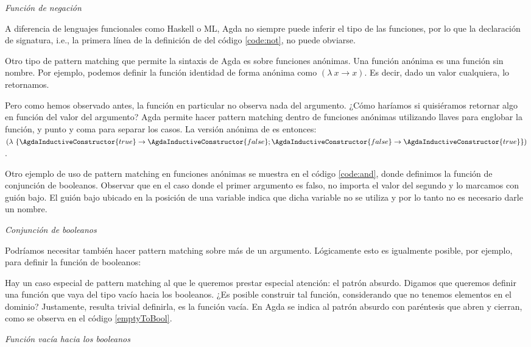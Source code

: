 \begin{agdacode}{\it Función de negación}\label{code:not}
  
\end{agdacode}

A diferencia de lenguajes funcionales como Haskell o ML, Agda no siempre puede inferir el tipo de las funciones, por lo que la declaración de signatura, i.e., la primera línea de la definición de  del código \ref{code:not}, no puede obviarse. 

Otro tipo de pattern matching que permite la sintaxis de Agda es sobre funciones anónimas. Una función anónima es una función sin nombre. Por ejemplo, podemos definir la función identidad de forma anónima como $(\lambda\ x \to x)$. Es decir, dado un valor cualquiera, lo retornamos.

Pero como hemos observado antes, la función  en particular no observa nada del argumento. ¿Cómo haríamos si quisiéramos retornar algo en función del valor del argumento? Agda permite hacer pattern matching dentro de funciones anónimas utilizando llaves para englobar la función, y punto y coma para separar los casos. La versión anónima de  es entonces: $(\lambda\ \{ \AgdaInductiveConstructor{true} \to \AgdaInductiveConstructor{false} ; \AgdaInductiveConstructor{false} \to \AgdaInductiveConstructor{true} \})$.

Otro ejemplo de uso de pattern matching en funciones anónimas se muestra en el código \ref{code:and}, donde definimos la función  de conjunción de booleanos. Observar que en el caso donde el primer argumento es falso, no importa el valor del segundo y lo marcamos con guión bajo. El guión bajo ubicado en la posición de una variable indica que dicha variable no se utiliza y por lo tanto no es necesario darle un nombre.  

\begin{agdacode}{\it Conjunción de booleanos}\label{code:and}
  
\end{agdacode}
Podríamos necesitar también hacer pattern matching sobre más de un argumento. Lógicamente esto es igualmente posible, por ejemplo, para definir la función  de booleanos:


Hay un caso especial de pattern matching al que le queremos prestar especial atención: el patrón absurdo. Digamos que queremos definir una función que vaya del tipo vacío hacia los booleanos. ¿Es posible construir tal función, considerando que no tenemos elementos en el dominio? Justamente, resulta trivial definirla, es la función vacía. En Agda se indica al patrón absurdo con paréntesis que abren y cierran, como se observa en el código \ref{emptyToBool}.
\begin{agdacode}{\it Función vacía hacia los booleanos}\label{emptyToBool}

\end{agdacode}

